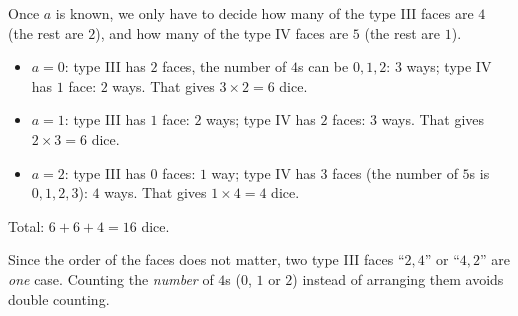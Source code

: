{
Once $a$ is known, we only have to decide how many of the type III faces are $4$ (the rest are $2$), and how many of the type IV faces are
$5$ (the rest are $1$).
\begin{itemize}[leftmargin=1.2em,itemsep=1pt,topsep=2pt]
\item $a=0$: type III has $2$ faces, the number of $4$s can be $0,1,2$: $3$ ways; type IV has $1$ face: $2$ ways. That gives $3\times2=6$ dice.
\item $a=1$: type III has $1$ face: $2$ ways; type IV has $2$ faces: $3$ ways. That gives $2\times3=6$ dice.
\item $a=2$: type III has $0$ faces: $1$ way; type IV has $3$ faces (the number of $5$s is $0,1,2,3$): $4$ ways. That gives $1\times4=4$ dice.
\end{itemize}
Total: $6+6+4=16$ dice.
\begin{warnbox}Since the order of the faces does not matter, two type III faces ``$2,4$'' or ``$4,2$'' are \emph{one} case. Counting the
\emph{number} of $4$s ($0$, $1$ or $2$) instead of arranging them avoids double counting.\end{warnbox}
}

